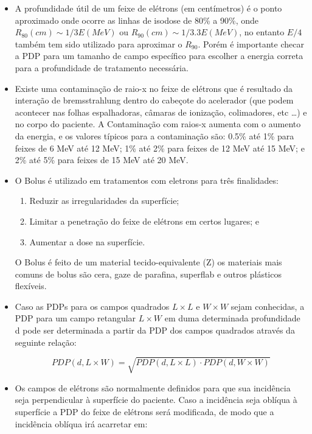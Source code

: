 \documentclass[11pt,a4paper]{article}
\newcounter{exemplo}
\begin{document}
\begin{exemplo}
\begin{itemize}
        \item A profundidade útil de um feixe de elétrons (em centímetros) é o ponto aproximado onde ocorre as linhas de isodose de 80\% a 90\%, onde $R_{80}(cm) \sim 1/3 E(MeV)$ ou $R_{90}(cm) \sim 1/3.3 E(MeV)$, no entanto $E/4$ também tem sido utilizado para aproximar o $R_{90}$. Porém é importante checar a PDP para um tamanho de campo específico para escolher a energia correta para a profundidade de tratamento necessária. 
        
        \item Existe uma contaminação de raio-x no feixe de elétrons que é resultado da interação de bremsstrahlung dentro do cabeçote do acelerador (que podem acontecer nas folhas espalhadoras, câmaras de ionização, colimadores, etc \dots) e no corpo do paciente. A Contaminação com raios-x aumenta com o aumento da energia, e os valores típicos para a contaminação são:  0.5\% até 1\% para feixes de 6 MeV até 12 MeV; 1\% até 2\% para feixes de 12 MeV até 15 MeV; e 2\% até 5\% para feixes de 15 MeV até 20 MeV.
        
        \item O Bolus é utilizado em tratamentos com eletrons para três finalidades:
        
            \begin{enumerate}[label=label=\textcolor{CarnationPink}{\roman*.}]
                \item Reduzir as irregularidades da superfície;
                \item Limitar a penetração do feixe de elétrons em certos lugares; e
                \item Aumentar a dose na superfície.
            \end{enumerate}
        O Bolus é feito de um material tecido-equivalente (Z) os materiais mais comuns de bolus são cera, gaze de parafina, superflab e outros plásticos flexíveis.

        \item Caso as PDPs para os campos quadrados $L \times L$ e $W \times W$ sejam conhecidas, a PDP para um campo retangular $L \times W$ em duma determinada profundidade d pode ser determinada a partir da PDP dos campos quadrados através da seguinte relação:
        
            $$PDP(d, L \times W) = \sqrt{PDP(d, L \times L) \cdot PDP(d, W \times W)}$$

        \item Os campos de elétrons são normalmente definidos para que sua incidência seja perpendicular à superfície do paciente. Caso a incidência seja oblíqua à superfície a PDP do feixe de elétrons será modificada, de modo que a incidência oblíqua irá acarretar em:
        

\end{itemize}
\end{exemplo}
\end{document}
